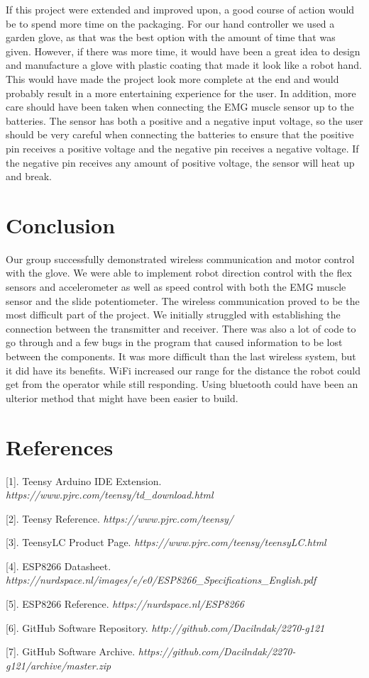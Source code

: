 \documentclass[12pt,scrartcl,titlepage]{article}
\begin{document}
If this project were extended and improved upon, a good course of action would be to spend more time on the packaging. For our hand controller we used a garden glove, as that was the best option with the amount of time that was given. However, if there was more time, it would have been a great idea to design and manufacture a glove with plastic coating that made it look like a robot hand. This would have made the project look more complete at the end and would probably result in a more entertaining experience for the user. In addition, more care should have been taken when connecting the EMG muscle sensor up to the batteries. The sensor has both a positive and a negative input voltage, so the user should be very careful when connecting the batteries to ensure that the positive pin receives a positive voltage and the negative pin receives a negative voltage. If the negative pin receives any amount of positive voltage, the sensor will heat up and break.

\section{Conclusion}

Our group successfully demonstrated wireless communication and motor control with the  glove. We were able to implement robot direction control with the flex sensors and accelerometer as well as speed control with both the EMG muscle sensor and the slide potentiometer. The wireless communication proved to be the most difficult part of the project. We initially struggled with establishing the connection between the transmitter and receiver. There was also a lot of code to go through and a few bugs in the program that caused information to be lost between the components. It was more difficult than the last wireless system, but it did have its benefits. WiFi increased our range for the distance the robot could get from the operator while still responding. Using bluetooth could have been an ulterior method that might have been easier to build.

\section{References}

[1]. Teensy Arduino IDE Extension. \textit{https://www.pjrc.com/teensy/td\_download.html}

[2]. Teensy Reference. \textit{https://www.pjrc.com/teensy/}

[3]. TeensyLC Product Page. \textit{https://www.pjrc.com/teensy/teensyLC.html}

[4]. ESP8266 Datasheet. \textit{https://nurdspace.nl/images/e/e0/ESP8266\_Specifications\_English.pdf}

[5]. ESP8266 Reference. \textit{https://nurdspace.nl/ESP8266}

[6]. GitHub Software Repository. \textit{http://github.com/Dacilndak/2270-g121}

[7]. GitHub Software Archive. \textit{https://github.com/Dacilndak/2270-g121/archive/master.zip}
\end{document}
